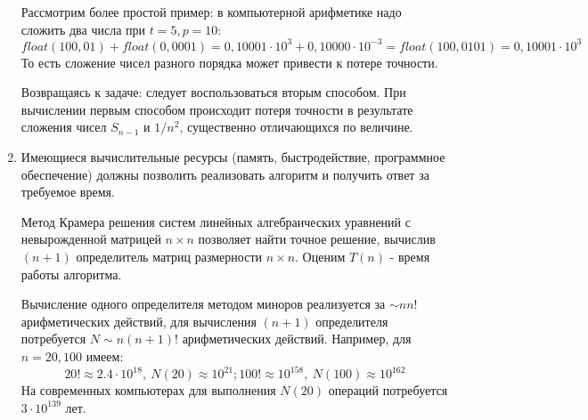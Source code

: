 \begin{enumerate}
\begin{example}
          Рассмотрим более простой пример: в компьютерной арифметике
          надо сложить два числа при $t=5,p=10$:
          \[float(100,01) + float(0,0001)=0,10001\cdot10^3 +0,10000\cdot10^{-3}=float(100,0101)=0,10001\cdot10^3\]
          То есть сложение чисел разного порядка может привести к потере точности.

          Возвращаясь к задаче: следует воспользоваться вторым
          способом. При вычислении первым способом происходит
          потеря точности в результате сложения чисел $S_{n-1}$ и $1/n^2$,
          существенно отличающихся по величине.
        \end{example}
  \item Имеющиеся вычислительные ресурсы (память, быстродействие,
        программное обеспечение) должны позволить реализовать алгоритм и получить ответ за требуемое время.
        \begin{example}
          Метод Крамера решения систем линейных алгебраических уравнений с невырожденной матрицей
          $n \times n$ позволяет найти точное решение, вычислив $(n + 1)$ определитель матриц размерности $n \times n$.
          Оценим $T(n)$ - время работы алгоритма.

          Вычисление одного определителя методом миноров реализуется за $\sim nn!$
          арифметических действий, для вычисления $(n + 1)$ определителя потребуется
          $N \sim n(n + 1)!$ арифметических действий. Например, для $n = 20, 100$ имеем:
          \[20!\approx2.4\cdot10^{18},\ N(20)\approx10^{21};100!\approx10^{158},\ N(100)\approx10^{162}\]
          На современных компьютерах для выполнения $N(20)$ операций потребуется $3\cdot10^{139}$ лет.
        \end{example}
\end{enumerate}
